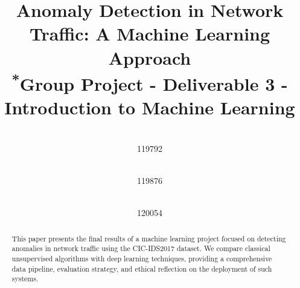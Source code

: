\documentclass[10pt,conference]{IEEEtran}
\begin{document}
\title{Anomaly Detection in Network Traffic: A Machine Learning Approach\\
{\footnotesize \textsuperscript{*}Group Project - Deliverable 3 - Introduction to Machine Learning}
}

\author{
 \\
119792
\and
{} \\
119876
\and
{} \\
120054
}

\maketitle

\begin{abstract}
This paper presents the final results of a machine learning project focused on detecting anomalies in network traffic using the CIC-IDS2017 dataset. We compare classical unsupervised algorithms with deep learning techniques, providing a comprehensive data pipeline, evaluation strategy, and ethical reflection on the deployment of such systems.
\end{abstract}



















\begingroup
\scriptsize


\endgroup
\end{document}
